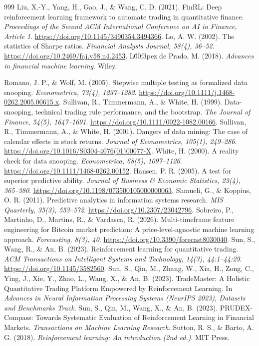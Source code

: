 \documentclass[analytics,article,submit,pdftex,moreauthors]{Definitions/mdpi}
\begin{document}
\begin{thebibliography}{999}
 Liu, X.-Y., Yang, H., Gao, J., \& Wang, C. D. (2021). FinRL: Deep reinforcement learning framework to automate trading in quantitative finance. \emph{Proceedings of the Second ACM International Conference on AI in Finance, Article 1}. \url{https://doi.org/10.1145/3490354.3494366}.
 Lo, A. W. (2002). The statistics of Sharpe ratios. \emph{Financial Analysts Journal, 58(4), 36--52}. \url{https://doi.org/10.2469/faj.v58.n4.2453}.
 L\u00f3pez de Prado, M. (2018). \emph{Advances in financial machine learning}. Wiley.

 Romano, J. P., \& Wolf, M. (2005). Stepwise multiple testing as formalized data snooping. \emph{Econometrica, 73(4), 1237--1282}. \url{https://doi.org/10.1111/j.1468-0262.2005.00615.x}.
 Sullivan, R., Timmermann, A., \& White, H. (1999). Data-snooping, technical trading rule performance, and the bootstrap. \emph{The Journal of Finance, 54(5), 1647--1691}. \url{https://doi.org/10.1111/0022-1082.00166}.
 Sullivan, R., Timmermann, A., \& White, H. (2001). Dangers of data mining: The case of calendar effects in stock returns. \emph{Journal of Econometrics, 105(1), 249--286}. \url{https://doi.org/10.1016/S0304-4076(01)00077-X}.
 White, H. (2000). A reality check for data snooping. \emph{Econometrica, 68(5), 1097--1126}. \url{https://doi.org/10.1111/1468-0262.00152}.
 Hansen, P. R. (2005). A test for superior predictive ability. \emph{Journal of Business \& Economic Statistics, 23(4), 365--380}. \url{https://doi.org/10.1198/073500105000000063}.
 Shmueli, G., \& Koppius, O. R. (2011). Predictive analytics in information systems research. \emph{MIS Quarterly, 35(3), 553--572}. \url{https://doi.org/10.2307/23042796}.
 Sobreiro, P., Martinho, D., Martins, R., \& Vardasca, R. (2026). Multi-timeframe feature engineering for Bitcoin market prediction: A price-level-agnostic machine learning approach. \emph{Forecasting, 8(3), 40}. \url{https://doi.org/10.3390/forecast8030040}.
 Sun, S., Wang, R., \& An, B. (2023). Reinforcement learning for quantitative trading. \emph{ACM Transactions on Intelligent Systems and Technology, 14(3), 44:1--44:29}. \url{https://doi.org/10.1145/3582560}.
 Sun, S., Qin, M., Zhang, W., Xia, H., Zong, C., Ying, J., Xie, Y., Zhao, L., Wang, X., \& An, B. (2023). TradeMaster: A Holistic Quantitative Trading Platform Empowered by Reinforcement Learning. In \emph{Advances in Neural Information Processing Systems (NeurIPS 2023), Datasets and Benchmarks Track}.
 Sun, S., Qin, M., Wang, X., \& An, B. (2023). PRUDEX-Compass: Towards Systematic Evaluation of Reinforcement Learning in Financial Markets. \emph{Transactions on Machine Learning Research}.
 Sutton, R. S., \& Barto, A. G. (2018). \emph{Reinforcement learning: An introduction (2nd ed.)}. MIT Press.


\end{thebibliography}
\end{document}
